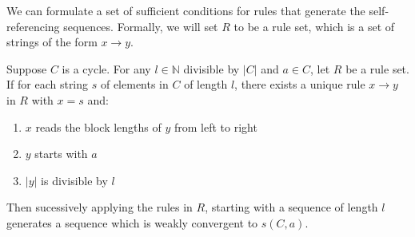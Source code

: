 \documentclass[runningheads,a4paper]{llncs}
\begin{document}

We can formulate a set of sufficient conditions for rules that generate the self-referencing sequences. Formally, we will set $R$ to be a rule set, which is a set of strings of the form $x \rightarrow y$.

\begin{proposition}
\label{ruleprop}
Suppose $C$ is a cycle. For any $l \in \mathbb{N}$ divisible by $|C|$ and $a \in C$, let $R$ be a rule set. If for each string $s$ of elements in $C$ of length $l$, there exists a unique rule $x \rightarrow y$ in $R$ with $x = s$ and:
\begin{enumerate}
\item $x$ reads the block lengths of $y$ from left to right
\item $y$ starts with $a$
\item $|y|$ is divisible by $l$
\end{enumerate}
Then sucessively applying the rules in $R$, starting with a sequence of length $l$ generates a sequence which is weakly convergent to $s(C, a)$.
\end{proposition}
\end{document}
